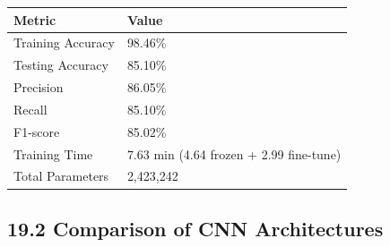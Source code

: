 \documentclass[11pt]{article}
\begin{document}
\begin{center}

\begin{tabular}{|p{5cm}|p{4cm}|}

\hline

Metric & Value\\

\hline

Training Accuracy & 98.46\%\\

\hline

Testing Accuracy & 85.10\%\\

\hline

Precision & 86.05\%\\

\hline

Recall & 85.10\%\\

\hline

F1-score & 85.02\%\\

\hline

Training Time & 7.63 min (4.64 frozen + 2.99 fine-tune)\\

\hline

Total Parameters & 2,423,242\\

\hline

\end{tabular}

\end{center}

\vspace{5mm}

\subsection*{19.2 Comparison of CNN Architectures}
\end{document}
